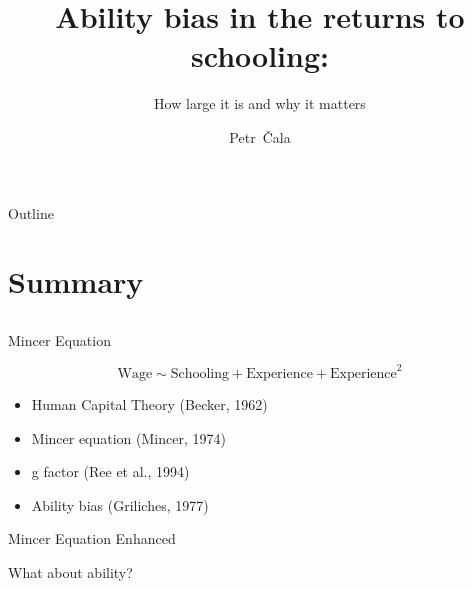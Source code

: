 \documentclass{beamer} %
\title[Ability bias and education] %
{Ability bias in the returns to schooling:}
\subtitle{How large it is and why it matters}
\author {Petr~\v{C}ala}
\institute[CUNI]
{
  Institute of Economic Studies\\
  Charles University, Prague\\
 
  \vspace{1.5em}

  \pgfdeclareimage[height=1.5cm]{logo}{Figures/logo.pdf} %
  \pgfuseimage{logo}

}
\date[June 19, 2024]
\begin{document}
\begin{frame}
    \titlepage
\end{frame}


\begin{frame}{Outline}
    \tableofcontents
\end{frame}


\section{Summary}
\subsection{}

\begin{frame}{Mincer Equation}

    \begin{center}
        \large
        \begin{equation*}
            \text{Wage} \sim \text{Schooling} + \text{Experience} + \text{Experience}^2
        \end{equation*}
    \end{center}


    \begin{itemize}
        \item Human Capital Theory \hfill (Becker, 1962)
        \item Mincer equation \hfill (Mincer, 1974)
        \item g factor \hfill (Ree et al., 1994)
        \item Ability bias \hfill (Griliches, 1977)
    \end{itemize}
\end{frame}

\begin{frame}{Mincer Equation Enhanced}
    \begin{center}

        \begin{Large}
            What about ability?
        \end{Large}


    \end{center}
\end{frame}
\end{document}
